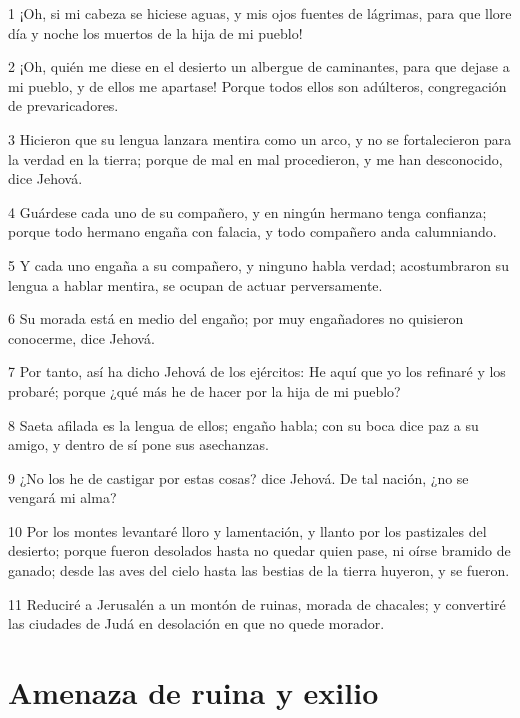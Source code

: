\par 1 ¡Oh, si mi cabeza se hiciese aguas, y mis ojos fuentes de lágrimas, para que llore día y noche los muertos de la hija de mi pueblo!
\par 2 ¡Oh, quién me diese en el desierto un albergue de caminantes, para que dejase a mi pueblo, y de ellos me apartase! Porque todos ellos son adúlteros, congregación de prevaricadores.
\par 3 Hicieron que su lengua lanzara mentira como un arco, y no se fortalecieron para la verdad en la tierra; porque de mal en mal procedieron, y me han desconocido, dice Jehová.
\par 4 Guárdese cada uno de su compañero, y en ningún hermano tenga confianza; porque todo hermano engaña con falacia, y todo compañero anda calumniando.
\par 5 Y cada uno engaña a su compañero, y ninguno habla verdad; acostumbraron su lengua a hablar mentira, se ocupan de actuar perversamente.
\par 6 Su morada está en medio del engaño; por muy engañadores no quisieron conocerme, dice Jehová.
\par 7 Por tanto, así ha dicho Jehová de los ejércitos: He aquí que yo los refinaré y los probaré; porque ¿qué más he de hacer por la hija de mi pueblo?
\par 8 Saeta afilada es la lengua de ellos; engaño habla; con su boca dice paz a su amigo, y dentro de sí pone sus asechanzas.
\par 9 ¿No los he de castigar por estas cosas? dice Jehová. De tal nación, ¿no se vengará mi alma?
\par 10 Por los montes levantaré lloro y lamentación, y llanto por los pastizales del desierto; porque fueron desolados hasta no quedar quien pase, ni oírse bramido de ganado; desde las aves del cielo hasta las bestias de la tierra huyeron, y se fueron.
\par 11 Reduciré a Jerusalén a un montón de ruinas, morada de chacales; y convertiré las ciudades de Judá en desolación en que no quede morador.

\section*{Amenaza de ruina y exilio}

